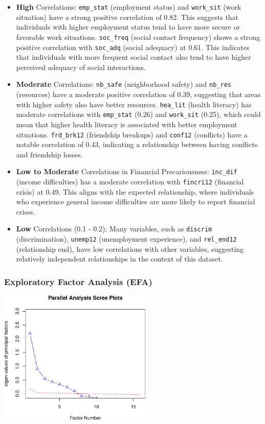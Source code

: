 \documentclass[
]{article}
\begin{document}
\begin{itemize}
\item
  \textbf{High} Correlations: \texttt{emp\_stat} (employment status) and
  \texttt{work\_sit} (work situation) have a strong positive correlation
  of 0.82. This suggests that individuals with higher employment status
  tend to have more secure or favorable work situations.
  \texttt{soc\_freq} (social contact frequency) shows a strong positive
  correlation with \texttt{soc\_adq} (social adequacy) at 0.61. This
  indicates that individuals with more frequent social contact also tend
  to have higher perceived adequacy of social interactions.
\item
  \textbf{Moderate} Correlations: \texttt{nb\_safe} (neighborhood
  safety) and \texttt{nb\_res} (resources) have a moderate positive
  correlation of 0.39, suggesting that areas with higher safety also
  have better resources. \texttt{hea\_lit} (health literacy) has
  moderate correlations with \texttt{emp\_stat} (0.26) and
  \texttt{work\_sit} (0.25), which could mean that higher health
  literacy is associated with better employment situations.
  \texttt{frd\_brk12} (friendship breakups) and \texttt{conf12}
  (conflicts) have a notable correlation of 0.43, indicating a
  relationship between having conflicts and friendship losses.
\item
  \textbf{Low to Moderate} Correlations in Financial Precariousness:
  \texttt{inc\_dif} (income difficulties) has a moderate correlation
  with \texttt{fincri12} (financial crisis) at 0.49. This aligns with
  the expected relationship, where individuals who experience general
  income difficulties are more likely to report financial crises.
\item
  \textbf{Low} Correlations (0.1 - 0.2): Many variables, such as
  \texttt{discrim} (discrimination), \texttt{unemp12} (unemployment
  experience), and \texttt{rel\_end12} (relationship end), have low
  correlations with other variables, suggesting relatively independent
  relationships in the context of this dataset.
\end{itemize}

\subsubsection{Exploratory Factor Analysis
(EFA)}\label{exploratory-factor-analysis-efa}

\begin{center}
\includegraphics[width=0.55\textwidth,height=\textheight]{draft_v3_files/figure-pdf/unnamed-chunk-13-1.pdf}
\end{center}
\end{document}
